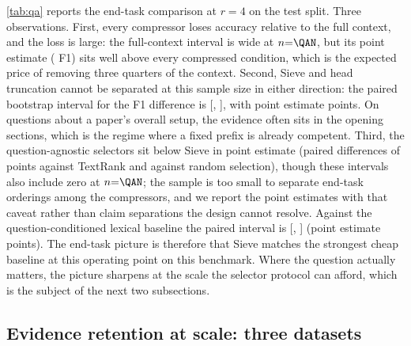 \documentclass[review,12pt]{elsarticle}
\theoremstyle{remark}
\newcommand{\method}{Sieve}
\begin{document}
\autoref{tab:qa} reports the end-task comparison at $r=4$ on the test
split. Three observations. First, every compressor loses accuracy
relative to the full context, and the loss is large: the full-context
interval is wide at $n{=}\QAN$, but its point estimate (\QAFullF{} F1)
sits well above every compressed condition, which is the expected
price of removing three quarters of the context. Second, \method{} and
head truncation cannot be separated at this sample size in either
direction: the paired bootstrap interval for the F1 difference is
[\QAPairSHLo, \QAPairSHHi], with point estimate \QAPairSH{} points. On
questions about a paper's overall setup, the evidence often sits in
the opening sections, which is the regime where a fixed prefix is
already competent. Third, the question-agnostic selectors sit below
\method{} in point estimate (paired differences of \QAPairSTR{} points
against TextRank and \QAPairSRan{} against random selection), though
these intervals also include zero at $n{=}\QAN$; the sample is too small
to separate end-task orderings among the compressors, and we report
the point estimates with that caveat rather than claim separations the
design cannot resolve.
\ifdefined\QAPairSBm Against the question-conditioned lexical
baseline the paired interval is
[\QAPairSBmLo, \QAPairSBmHi] (point estimate \QAPairSBm{} points).
\fi{} The end-task picture is therefore that
\method{} matches the strongest cheap baseline at this operating point
on this benchmark. Where the question actually matters, the picture
sharpens at the scale the selector protocol can afford, which is the
subject of the next two subsections.

\subsection{Evidence retention at scale: three datasets}
\label{sec:recall}
\end{document}
